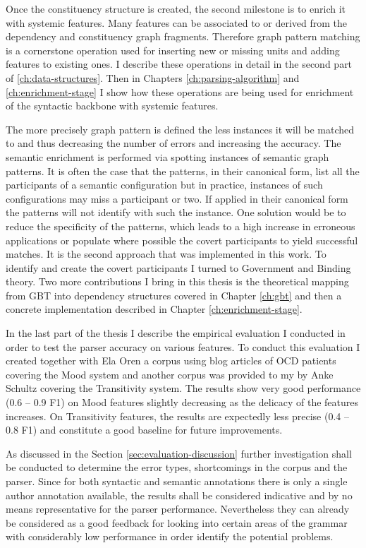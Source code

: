 Once the constituency structure is created, the second milestone is to enrich it with systemic features. Many features can be associated to or derived from the dependency and constituency graph fragments. Therefore graph pattern matching is a cornerstone operation used for inserting new or missing units and adding features to existing ones. I describe these operations in detail in the second part of \ref{ch:data-structures}. Then in Chapters \ref{ch:parsing-algorithm} and \ref{ch:enrichment-stage} I show how these operations are being used for enrichment of the syntactic backbone with systemic features.

The more precisely graph pattern is defined the less instances it will be matched to and thus decreasing the number of errors and increasing the accuracy. The semantic enrichment is performed via spotting instances of semantic graph patterns. It is often the case that the patterns, in their canonical form, list all the participants of a semantic configuration but in practice, instances of such configurations may miss a participant or two. If applied in their canonical form the patterns will not identify with such the instance. One solution would be to reduce the specificity of the patterns, which leads to a high increase in erroneous applications or populate where possible the covert participants to yield successful matches. It is the second approach that was implemented in this work. To identify and create the covert participants I turned to Government and Binding theory. Two more contributions I bring in this thesis is the theoretical mapping from GBT into dependency structures covered in Chapter \ref{ch:gbt} and then a concrete implementation described in Chapter \ref{ch:enrichment-stage}.

In the last part of the thesis I describe the empirical evaluation I conducted in order to test the parser accuracy on various features. To conduct this evaluation I created together with Ela Oren a corpus using blog articles of OCD patients covering the Mood system and another corpus was provided to my by Anke Schultz covering the Transitivity system. The results show very good performance (0.6 -- 0.9 F1) on Mood features slightly decreasing as the delicacy of the features increases. On Transitivity features, the results are expectedly less precise (0.4 -- 0.8 F1) and constitute a good baseline for future improvements. 

As discussed in the Section \ref{sec:evaluation-discussion} further investigation shall be conducted to determine the error types, shortcomings in the corpus and the parser. Since for both syntactic and semantic annotations there is only a single author annotation available, the results shall be considered indicative and by no means representative for the parser performance. Nevertheless they can already be considered as a good feedback for looking into certain areas of the grammar with considerably low performance in order identify the potential problems.

